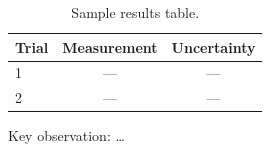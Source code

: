 \begin{table}[ht]
\centering
\begin{tabular}{lcc}
\toprule
Trial & Measurement & Uncertainty \\
\midrule
1 & --- & --- \\
2 & --- & --- \\
\bottomrule
\end{tabular}
\caption{Sample results table.}
\end{table}


Key observation: \ldots
